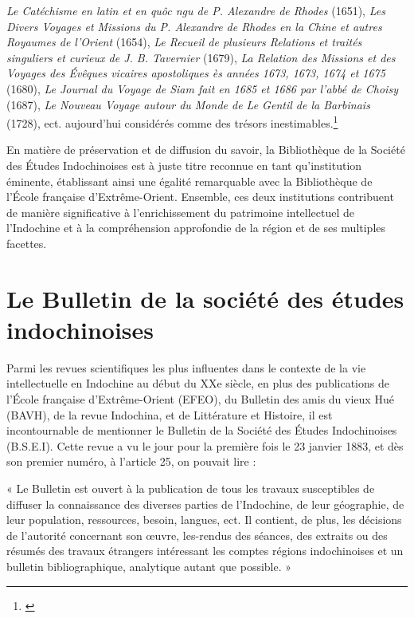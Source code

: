 \textit{Le Catéchisme en latin et en quôc ngu de P. Alexandre de Rhodes} (1651), \textit{Les Divers Voyages et Missions du P. Alexandre de Rhodes en la Chine et autres Royaumes de l'Orient} (1654), \textit{Le Recueil de plusieurs Relations et traités singuliers et curieux de J. B. Tavernier} (1679), \textit{La Relation des Missions et des Voyages des Évêques vicaires apostoliques ès années 1673, 1673, 1674 et 1675} (1680), \textit{Le Journal du Voyage de Siam fait en 1685 et 1686 par l'abbé de Choisy} (1687), \textit{Le Nouveau Voyage autour du Monde de Le Gentil de la Barbinais} (1728), ect. aujourd'hui considérés comme des trésors inestimables.\footnote{\cite{bilo}}

En matière de préservation et de diffusion du savoir, la Bibliothèque de la Société des Études Indochinoises est à juste titre reconnue en tant qu'institution éminente, établissant ainsi une égalité remarquable avec la Bibliothèque de l'École française d'Extrême-Orient. Ensemble, ces deux institutions contribuent de manière significative à l'enrichissement du patrimoine intellectuel de l'Indochine et à la compréhension approfondie de la région et de ses multiples facettes.




\section{Le Bulletin de la société des études indochinoises}

Parmi les revues scientifiques les plus influentes dans le contexte de la vie intellectuelle en Indochine au début du XXe siècle, en plus des publications de l'École française d'Extrême-Orient (EFEO), du Bulletin des amis du vieux Hué (BAVH), de la revue Indochina, et de Littérature et Histoire, il est incontournable de mentionner le Bulletin de la Société des Études Indochinoises (B.S.E.I). Cette revue a vu le jour pour la première fois le 23 janvier 1883, et dès son premier numéro, à l'article 25, on pouvait lire :

« Le Bulletin est ouvert à la publication de tous les travaux susceptibles de diffuser la connaissance des diverses parties de l’Indochine, de leur géographie, de leur population, ressources, besoin, langues, ect. Il contient, de plus, les décisions de l'autorité concernant son œuvre, les-rendus des séances, des extraits ou des résumés des travaux étrangers intéressant les comptes régions indochinoises et un bulletin bibliographique, analytique autant que possible. »

